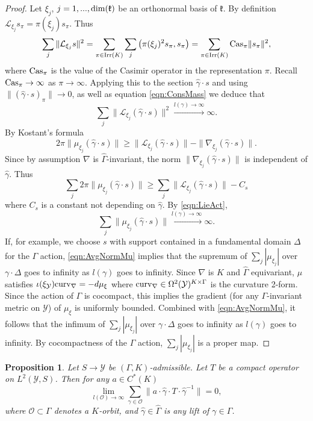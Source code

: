 \documentclass[11pt,reqno]{amsart}
\newtheorem{proposition}[theorem]{Proposition}
\theoremstyle{definition}
\theoremstyle{remark}
\newcommand{\tn}[1]{\textnormal{#1}}
\def\k{\ensuremath{\mathfrak{k}}}
\def\L{\ensuremath{\mathcal{L}}}
\def\O{\ensuremath{\mathcal{O}}}
\def\Y{\ensuremath{\mathcal{Y}}}
\def\O{\ensuremath{\mathcal{O}}}
\def\.{\ensuremath{\cdot}}
\def\dim{\ensuremath{\textnormal{dim}}}
\def\Irr{\ensuremath{\tn{Irr}}}
\def\hGamma{\ensuremath{\widehat{\Gamma}}}
\def\hgamma{\ensuremath{\widehat{\gamma}}}
\begin{document}
\begin{proof}
Let $\xi_j$, $j=1,...,\dim(\k)$ be an orthonormal basis of $\k$.  By definition $\L_{\xi_j}s_\pi=\pi(\xi_j)s_\pi$.  Thus
\[ \sum_j \|\L_{\xi_j}s\|^2=\sum_{\pi \in \Irr(K)}\sum_j \big(\pi(\xi_j)^2s_\pi,s_\pi\big)=\sum_{\pi \in \Irr(K)}\tn{Cas}_\pi \|s_\pi\|^2,\]
where $\tn{Cas}_\pi$ is the value of the Casimir operator in the representation $\pi$.  Recall $\tn{Cas}_\pi \rightarrow \infty$ as $\pi \rightarrow \infty$.  Applying this to the section $\hgamma \cdot s$ and using $\|(\hgamma \cdot s)_\pi\| \rightarrow 0$, as well as equation \eqref{eqn:ConsMass} we deduce that
\begin{equation} 
\label{eqn:LieAct}
\sum_j \|\L_{\xi_j}(\hgamma\cdot s)\|^2 \xrightarrow{l(\gamma)\rightarrow \infty} \infty.
\end{equation}
By Kostant's formula
\[ 2\pi\|\mu_{\xi_j} (\hgamma \cdot s)\| \ge \|\L_{\xi_j}(\hgamma \cdot s)\|-\|\nabla_{\xi_j}(\hgamma \cdot s)\|.\]
Since by assumption $\nabla$ is $\hGamma$-invariant, the norm $\|\nabla_{\xi_j}(\hgamma \cdot s)\|$ is independent of $\hgamma$.  Thus
\[ \sum_j 2\pi\|\mu_{\xi_j} (\hgamma \cdot s)\| \ge \sum_j\|\L_{\xi_j}(\hgamma \cdot s)\| - C_s \]
where $C_s$ is a constant not depending on $\hgamma$.  By \eqref{eqn:LieAct},
\begin{equation} 
\label{eqn:AvgNormMu}
\sum_j \|\mu_{\xi_j}(\hgamma \cdot s)\| \xrightarrow{l(\gamma)\rightarrow \infty} \infty.
\end{equation}
If, for example, we choose $s$ with support contained in a fundamental domain $\Delta$ for the $\Gamma$ action, \eqref{eqn:AvgNormMu} implies that the supremum of $\sum_j |\mu_{\xi_j}|$ over $\gamma \cdot \Delta$ goes to infinity as $l(\gamma)$ goes to infinity.  Since $\nabla$ is $K$ and $\hGamma$ equivariant, $\mu$ satisfies $\iota(\xi_{\Y})\tn{curv}_\nabla=-d\mu_\xi$ where $\tn{curv}_\nabla \in \Omega^2(\Y)^{K\times \Gamma}$ is the curvature 2-form.  Since the action of $\Gamma$ is cocompact, this implies the gradient (for any $\Gamma$-invariant metric on $\Y$) of $\mu_\xi$ is uniformly bounded.  Combined with \eqref{eqn:AvgNormMu}, it follows that the infimum of $\sum_j |\mu_{\xi_j}|$ over $\gamma \cdot \Delta$ goes to infinity as $l(\gamma)$ goes to infinity.  By cocompactness of the $\Gamma$ action, $\sum_j |\mu_{\xi_j}|$ is a proper map. 
\end{proof}
%
\begin{proposition}
\label{prop:admissiblecompact}
Let $S \rightarrow \Y$ be $(\Gamma,K)$-admissible.  Let $T$ be a compact operator on $L^2(\Y,S)$.  Then for any $a \in C^\ast(K)$
\[ \lim_{l(\O)\rightarrow \infty} \sum_{\gamma \in \O} \|a\cdot \hgamma \cdot T \.\hgamma^{-1} \|=0,\]
where $\O \subset \Gamma$ denotes a $K$-orbit, and $\hgamma \in \hGamma$ is any lift of $\gamma \in \Gamma$.
\end{proposition}
\end{document}
